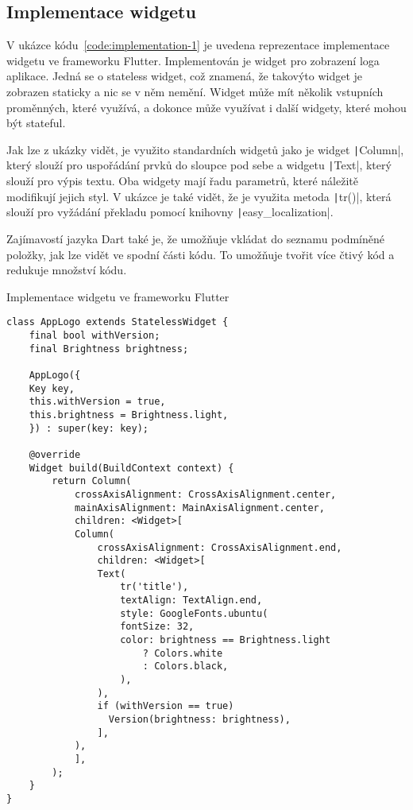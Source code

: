\subsection{Implementace widgetu}

V ukázce kódu~\ref{code:implementation-1} je uvedena reprezentace implementace widgetu
ve frameworku Flutter.
Implementován je widget pro zobrazení loga aplikace.
Jedná se o stateless widget,
což znamená,
že takovýto widget je zobrazen staticky a nic se v něm nemění.
Widget může mít několik vstupních proměnných,
které využívá,
a dokonce může využívat i další widgety,
které mohou být stateful.

Jak lze z ukázky vidět,
je využito standardních widgetů jako je widget \texttt|Column|,
který slouží pro uspořádání prvků do sloupce pod sebe a
widgetu \texttt|Text|,
který slouží pro výpis textu.
Oba widgety mají řadu parametrů,
které náležitě modifikují jejich styl.
V ukázce je také vidět,
že je využita metoda \texttt|tr()|,
která slouží pro vyžádání překladu pomocí knihovny \texttt|easy_localization|.

Zajímavostí jazyka Dart také je,
že umožňuje vkládat do seznamu podmíněné položky,
jak lze vidět ve spodní části kódu.
To umožňuje tvořit více čtivý kód a redukuje množství kódu.

\begin{listing}
    \caption{Implementace widgetu ve frameworku Flutter}
    \label{code:implementation-1}
    \begin{verbatim}
class AppLogo extends StatelessWidget {
    final bool withVersion;
    final Brightness brightness;

    AppLogo({
    Key key,
    this.withVersion = true,
    this.brightness = Brightness.light,
    }) : super(key: key);

    @override
    Widget build(BuildContext context) {
        return Column(
            crossAxisAlignment: CrossAxisAlignment.center,
            mainAxisAlignment: MainAxisAlignment.center,
            children: <Widget>[
            Column(
                crossAxisAlignment: CrossAxisAlignment.end,
                children: <Widget>[
                Text(
                    tr('title'),
                    textAlign: TextAlign.end,
                    style: GoogleFonts.ubuntu(
                    fontSize: 32,
                    color: brightness == Brightness.light
                        ? Colors.white
                        : Colors.black,
                    ),
                ),
                if (withVersion == true)
                  Version(brightness: brightness),
                ],
            ),
            ],
        );
    }
}
    \end{verbatim}
\end{listing}

